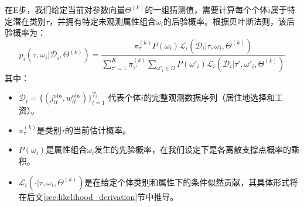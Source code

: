 \documentclass[
  a4paper,
  zihao=-4,
  fontset=mac,
  AutoFakeBold,
  AutoFakeSlant,
  oneside]{ctexbook}
\begin{document}
在E步，我们给定当前对参数向量$\Theta^{(k)}$的一组猜测值，需要计算每个个体$i$属于特定潜在类别$\tau$，并拥有特定未观测属性组合$\omega_i$的后验概率。根据贝叶斯法则，该后验概率为：
\begin{equation}
    p_{i}(\tau, \omega_i | \mathcal{D}_i, \Theta^{(k)}) = \frac{\pi_\tau^{(k)} P(\omega_i) \mathcal{L}_i(\mathcal{D}_i | \tau, \omega_i, \Theta^{(k)})}{\sum_{\tau'=1}^K \pi_{\tau'}^{(k)} \sum_{\omega'_i \in \Omega} P(\omega'_i) \mathcal{L}_i(\mathcal{D}_i | \tau', \omega'_i, \Theta^{(k)})}
\end{equation}
其中：
\begin{itemize}
    \item $\mathcal{D}_i = \{(j_{it}^{\text{obs}}, w_{it}^{\text{obs}})\}_{t=1}^{T_i}$ 代表个体$i$的完整观测数据序列（居住地选择和工资）。
    \item $\pi_\tau^{(k)}$是类别$\tau$的当前估计概率。
    \item $P(\omega_i)$是属性组合$\omega_i$发生的先验概率，在我们设定下是各离散支撑点概率的乘积。
    \item $\mathcal{L}_i(\cdot | \tau, \omega_i, \Theta^{(k)})$是在给定个体类别和属性下的条件似然贡献，其具体形式将在后文\ref{sec:likelihood_derivation}节中推导。
\end{itemize}
\end{document}
